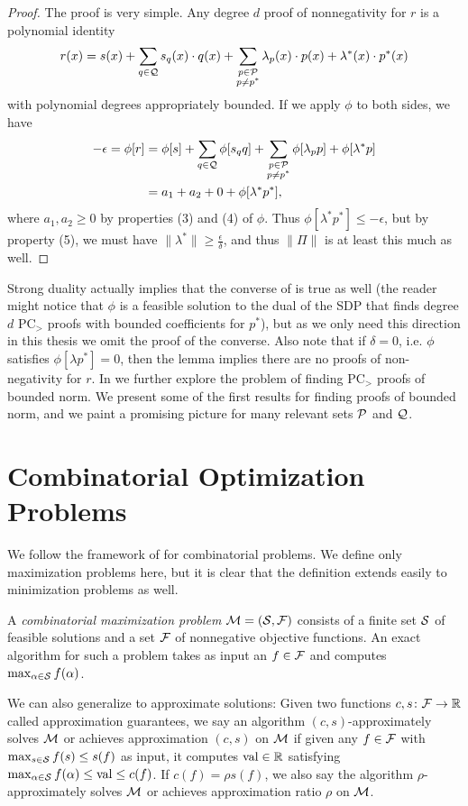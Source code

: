 \begin{proof}
The proof is very simple. Any degree $d$ proof of nonnegativity for $r$ is a polynomial identity
\[r(x) = s(x) + \sum_{q \in \mathcal Q} s_q(x)\cdot q(x) + \sum_{\substack{p \in \mathcal P \\ p \neq p^*}} \lambda_p(x) \cdot p(x) + \lambda^*(x) \cdot p^*(x)\]
with polynomial degrees appropriately bounded. If we apply $\phi$ to both sides, we have
\begin{align*}
-\epsilon = \phi[r] &= \phi[s] + \sum_{q \in \mathcal Q} \phi[s_qq] + \sum_{\substack{p \in \mathcal P \\ p \neq p^*}} \phi[\lambda_p p] + \phi[\lambda^*p] \\
&= a_1 + a_2 + 0 + \phi[\lambda^* p^*],
\end{align*}
where $a_1,a_2 \geq 0$ by properties (3) and (4) of $\phi$. Thus $\phi[\lambda^* p^*] \leq -\epsilon$, but by property (5), we must have $\|\lambda^*\| \geq \frac{\epsilon}{\delta}$, and thus $\|\Pi\|$ is at least this much as well.
\end{proof}
Strong duality actually implies that the converse of  is true as well (the reader might notice that $\phi$ is a feasible solution to the dual of the SDP that finds degree $d$ PC$_>$ proofs with bounded coefficients for $p^*$), but as we only need this direction in this thesis we omit the proof of the converse. Also note that if $\delta = 0$, i.e. $\phi$ satisfies $\phi[\lambda p^*] = 0$, then the lemma implies there are no proofs of non-negativity for $r$. In
 we further explore the problem of finding PC$_>$ proofs of bounded norm. We present some of the first results for finding proofs of bounded norm, and we paint a promising picture for many relevant sets $\mathcal P$ and $\mathcal Q$.

\section{Combinatorial Optimization Problems}\label{sec:prelims_comb_opt}
We follow the framework of \cite{BPZ15} for combinatorial problems.
We define only maximization problems here, but it is clear that the definition extends easily to minimization problems as well.
\begin{definition}
A \emph{combinatorial maximization problem} \(\mathcal M = (\mathcal S, \mathcal F)\)
consists of a finite set
\(\mathcal S\) of feasible solutions and a set \(\mathcal F\) of nonnegative
objective functions. An exact algorithm for such a problem takes as input an $f \in \mathcal F$ and computes
$\max_{\alpha \in \mathcal S} f(\alpha)$.

We can also generalize to approximate solutions: Given two functions \(c,s \colon \mathcal F \rightarrow \mathbb R\)
called approximation guarantees, we say
an algorithm \((c,s)\)-approximately solves \(\mathcal M\) or achieves approximation $(c,s)$ on $\mathcal M$
if given any \(f \in \mathcal F\) with \(\max_{s \in \mathcal S} f(s) \leq s(f)\) as input,
it computes \(\operatorname{val} \in \mathbb R\) satisfying
\(\max_{\alpha \in \mathcal S} f(\alpha) \leq \operatorname{val} \leq c(f)\).
If $c(f) = \rho s(f)$, we also say the algorithm $\rho$-approximately solves $\mathcal M$ or achieves approximation ratio $\rho$ on $\mathcal M$.
\end{definition}

